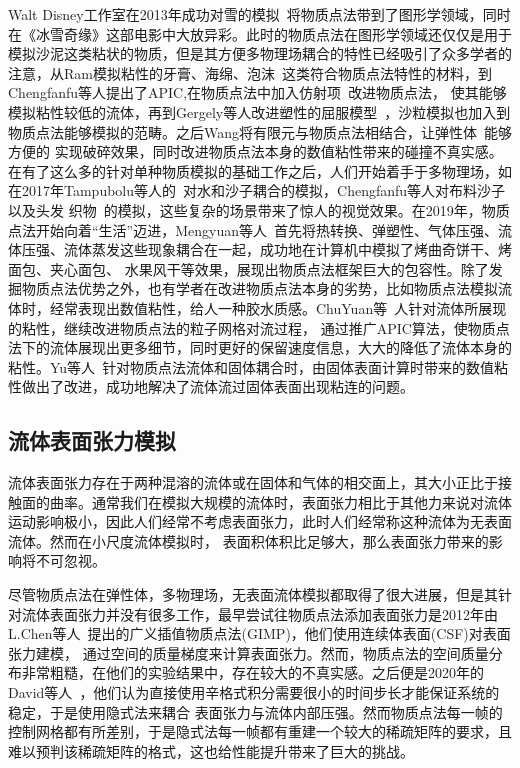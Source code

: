 Walt Disney工作室在2013年成功对雪的模拟~\cite{stomakhin2013material}将物质点法带到了图形学领域，同时在《冰雪奇缘》这部电影中大放异彩。此时的物质点法在图形学领域还仅仅是用于
模拟沙泥这类粘状的物质，但是其方便多物理场耦合的特性已经吸引了众多学者的注意，从Ram模拟粘性的牙膏、海绵、泡沫~\cite{2015foams}这类符合物质点法特性的材料，到Chengfanfu等人提出了APIC,在物质点法中加入仿射项~\cite{jiang2015affine}改进物质点法，
使其能够模拟粘性较低的流体，再到Gergely等人改进塑性的屈服模型~\cite{klar2016drucker}，沙粒模拟也加入到物质点法能够模拟的范畴。之后Wang将有限元与物质点法相结合，让弹性体~\cite{2019WangDuctile}能够方便的
实现破碎效果，同时改进物质点法本身的数值粘性带来的碰撞不真实感。在有了这么多的针对单种物质模拟的基础工作之后，人们开始着手于多物理场，如在2017年Tampubolu等人的~\cite{tampubolon2017multi}对水和沙子耦合的模拟，Chengfanfu等人对布料沙子以及头发
织物~\cite{jiang2017anisotropic}的模拟，这些复杂的场景带来了惊人的视觉效果。在2019年，物质点法开始向着“生活”迈进，Mengyuan等人~\cite{Ding2019}首先将热转换、弹塑性、气体压强、流体压强、流体蒸发这些现象耦合在一起，成功地在计算机中模拟了烤曲奇饼干、烤面包、夹心面包、
水果风干等效果，展现出物质点法框架巨大的包容性。除了发掘物质点法优势之外，也有学者在改进物质点法本身的劣势，比如物质点法模拟流体时，经常表现出数值粘性，给人一种胶水质感。ChuYuan等~\cite{fu2017polynomial}人针对流体所展现的粘性，继续改进物质点法的粒子网格对流过程，
通过推广APIC算法，使物质点法下的流体展现出更多细节，同时更好的保留速度信息，大大的降低了流体本身的粘性。Yu等人~\cite{fang2020iq}针对物质点法流体和固体耦合时，由固体表面计算时带来的数值粘性做出了改进，成功地解决了流体流过固体表面出现粘连的问题。

\subsection{流体表面张力模拟}
流体表面张力存在于两种混溶的流体或在固体和气体的相交面上，其大小正比于接触面的曲率。通常我们在模拟大规模的流体时，表面张力相比于其他力来说对流体运动影响极小，因此人们经常不考虑表面张力，此时人们经常称这种流体为无表面流体。然而在小尺度流体模拟时，
表面积体积比足够大，那么表面张力带来的影响将不可忽视。

尽管物质点法在弹性体，多物理场，无表面流体模拟都取得了很大进展，但是其针对流体表面张力并没有很多工作，最早尝试往物质点法添加表面张力是2012年由L.Chen等人~\cite{chen2012modeling}提出的广义插值物质点法(GIMP)，他们使用连续体表面(CSF)对表面张力建模，
通过空间的质量梯度来计算表面张力。然而，物质点法的空间质量分布非常粗糙，在他们的实验结果中，存在较大的不真实感。之后便是2020年的David等人~\cite{hyde2020implicit}，他们认为直接使用辛格式积分需要很小的时间步长才能保证系统的稳定，于是使用隐式法来耦合
表面张力与流体内部压强。然而物质点法每一帧的控制网格都有所差别，于是隐式法每一帧都有重建一个较大的稀疏矩阵的要求，且难以预判该稀疏矩阵的格式，这也给性能提升带来了巨大的挑战。

